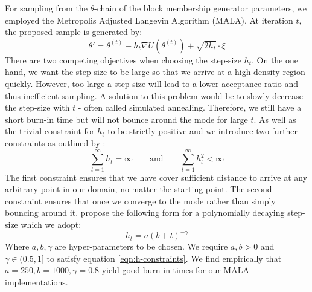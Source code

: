 \documentclass{article}
\begin{document}
For sampling from the $\theta$-chain of the block membership generator parameters, we employed the Metropolis Adjusted Langevin Algorithm (MALA). At iteration $t$, the proposed sample is generated by:
%
\begin{equation}
	\theta' = \theta^{(t)} - h_t \nabla U(\theta^{(t)}) + \sqrt{2h_t} \cdot \xi
\end{equation}
%
There are two competing objectives when choosing the step-size $h_t$. On the one hand, we want the step-size to be large so that we arrive at a high density region quickly. However, too large a step-size will lead to a lower acceptance ratio and thus inefficient sampling. A solution to this problem would be to slowly decrease the step-size with $t$ - often called simulated annealing. Therefore, we still have a short burn-in time but will not bounce around the mode for large $t$. As well as the trivial constraint for $h_t$ to be strictly positive and we introduce two further constraints as outlined by \citet{Bayesian-SGLD}:
%
\begin{equation}
	\sum_{t=1}^{\infty} h_t = \infty \qquad \textrm{and} \qquad
	\sum_{t=1}^{\infty} h_t^2 < \infty
	\label{eqn:h-constraints}
\end{equation}
%
The first constraint ensures that we have cover sufficient distance to arrive at any arbitrary point in our domain, no matter the starting point. The second constraint ensures that once we converge to the mode rather than simply bouncing around it. \citet{Bayesian-SGLD} propose the following form for a polynomially decaying step-size which we adopt:
%
\begin{equation}
	h_t = a(b + t)^{-\gamma}
\end{equation}
%
Where $a, b, \gamma$ are hyper-parameters to be chosen. We require $a,b > 0$ and $\gamma \in (0.5, 1]$ to satisfy equation \ref{eqn:h-constraints}. We find empirically that $a=250, b=1000, \gamma=0.8$ yield good burn-in times for our MALA implementations.
\end{document}
